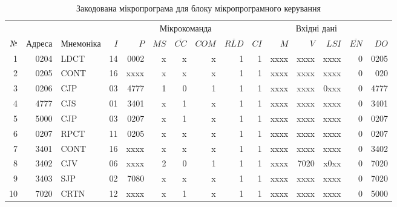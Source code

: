 \documentclass[a4paper,oneside,DIV=12,12pt,headings=normal]{scrartcl}
\begin{document}
			\begin{landscape}
				\begin{table}[p]
				\centering
					\begin{tabular}{rrl*{12}{r}}
						\toprule
							 &  &  & \multicolumn{7}{c}{Мікрокоманда} & \multicolumn{4}{c}{Вхідні дані} &  \\
							 \cmidrule(lr){4-10} \cmidrule(lr){11-14}
							 № & Адреса & Мнемоніка & $I$ & $P$ & $MS$ & $\overline{CC}$ & $COM$ & $\overline{RLD}$ & $CI$ & $M$ & $V$ & $LSI$ & $\overline{EN}$ & $DO$ \\
						\midrule
							1  & 0204 & LDCT & 14 & 0002 & x & x & x & 1 & 1 & xxxx & xxxx & xxxx & 0 & 0205 \\
							2  & 0205 & CONT & 16 & xxxx & x & x & x & 1 & 1 & xxxx & xxxx & xxxx & 0 & 020 \\
							3  & 0206 & CJP  & 03 & 4777 & 1 & 0 & 1 & 1 & 1 & xxxx & xxxx & 0xxx & 0 & 4777 \\
							4  & 4777 & CJS  & 01 & 3401 & x & 1 & x & 1 & 1 & xxxx & xxxx & xxxx & 0 & 3401 \\
							5  & 5000 & CJP  & 03 & 0207 & x & 1 & x & 1 & 1 & xxxx & xxxx & xxxx & 0 & 0207 \\
							6  & 0207 & RPCT & 11 & 0205 & x & x & x & 1 & 1 & xxxx & xxxx & xxxx & 0 & 0207 \\
							7  & 3401 & CONT & 16 & xxxx & x & x & x & 1 & 1 & xxxx & xxxx & xxxx & 0 & 3402 \\
							8  & 3402 & CJV  & 06 & xxxx & 2 & 0 & 1 & 1 & 1 & xxxx & 7020 & x0xx & 0 & 7020 \\
							9  & 3403 & SJP  & 02 & 7080 & x & x & x & 1 & 1 & xxxx & xxxx & xxxx & 0 & 7020 \\
							10 & 7020 & CRTN & 12 & xxxx & x & 1 & x & 1 & 1 & xxxx & xxxx & xxxx & 0 & 5000 \\
						\bottomrule
					\end{tabular}
				\caption{Закодована мікропрограма для блоку мікропрограмного керування}
				\label{tab:coded-microprogram}
				\end{table}
			\end{landscape}
\end{document}
